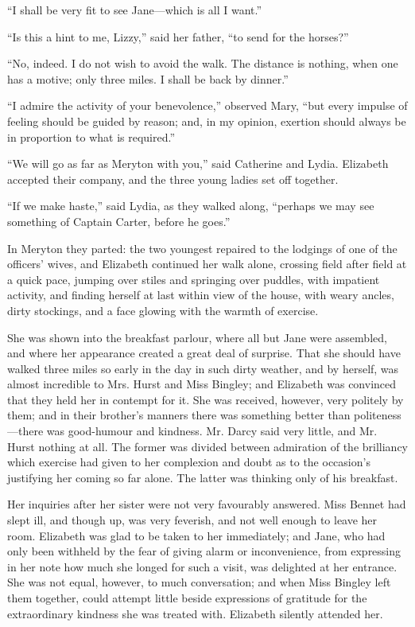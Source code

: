 \documentclass[10pt]{book}
\begin{document}
   “I shall be very fit to see Jane—which is all I want.”
  

   “Is this a hint to me, Lizzy,” said her father, “to send for the
horses?”
  

   “No, indeed. I do not wish to avoid the walk. The distance is nothing,
when one has a motive; only three miles. I shall be back by dinner.”
  

   “I admire the activity of your benevolence,” observed Mary, “but every
impulse of feeling should be guided by reason; and, in my opinion,
exertion should always be in proportion to what is required.”
  

   “We will go as far as Meryton with you,” said Catherine and Lydia.
Elizabeth accepted their company, and the three young ladies set off
together.
  

   “If we make haste,” said Lydia, as they walked along, “perhaps we may
see something of Captain Carter, before he goes.”
  

   In Meryton they parted: the two youngest repaired to the lodgings of one
of the officers’ wives, and Elizabeth continued her walk alone, crossing
field after field at a quick pace, jumping over stiles and springing
over puddles, with impatient activity, and finding herself at last
within view of the house, with weary ancles, dirty stockings, and a face
glowing with the warmth of exercise.
  

   She was shown into the breakfast parlour, where all but Jane were
assembled, and where her appearance created a great deal of surprise.
That she should have walked three miles so early in the day in such
dirty weather, and by herself, was almost incredible to Mrs. Hurst and
Miss Bingley; and Elizabeth was convinced that they held her in contempt
for it. She was received, however, very politely by them; and in their
brother’s manners there was something better than politeness—there was
good-humour and kindness. Mr. Darcy said very little, and Mr. Hurst
nothing at all. The former was divided between admiration of the
brilliancy which exercise had given to her complexion and doubt as to
the occasion’s justifying her coming so far alone. The latter was
thinking only of his breakfast.
  

   Her inquiries after her sister were not very favourably answered. Miss
Bennet had slept ill, and though up, was very feverish, and not well
enough to leave her room. Elizabeth was glad to be taken to her
immediately; and Jane, who had only been withheld by the fear of giving
alarm or inconvenience, from expressing in her note how much she longed
for such a visit, was delighted at her entrance. She was not equal,
however, to much conversation; and when Miss Bingley left them together,
could attempt little beside expressions of gratitude for the
extraordinary kindness she was treated with. Elizabeth silently attended
her.
  
\end{document}
